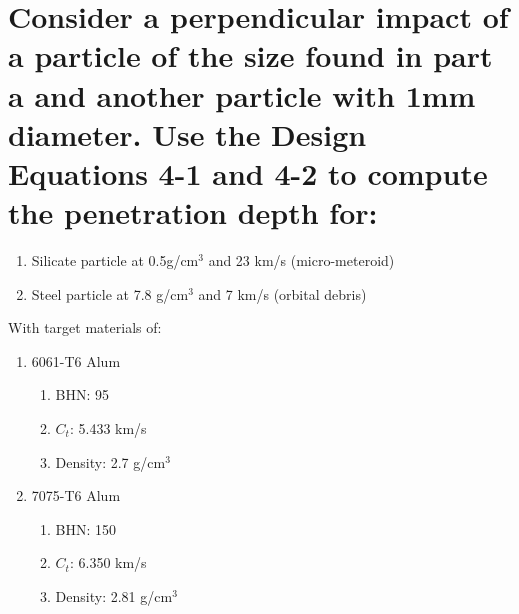 \documentclass[onecolumn,10pt]{jhwhw}
\begin{document}
\part{Consider a perpendicular impact of a particle of the size found in part a and another particle with 1mm diameter. Use the Design Equations 4-1 and 4-2 to compute the penetration depth for:}
\begin{enumerate}
\item Silicate particle at 0.5g/cm$^3$ and 23 km/s (micro-meteroid)
\item Steel particle at 7.8 g/cm$^3$ and 7 km/s (orbital debris)
\end{enumerate}
With target materials of:
\begin{enumerate}
\item 6061-T6 Alum
\begin{enumerate}
\item BHN: 95
\item $C_t$: 5.433 km/s
\item Density: 2.7 g/cm$^3$
\end{enumerate}
\item 7075-T6 Alum
\begin{enumerate}
\item BHN: 150
\item $C_t$: 6.350 km/s
\item Density: 2.81 g/cm$^3$
\end{enumerate}
\end{enumerate}
\end{document}

